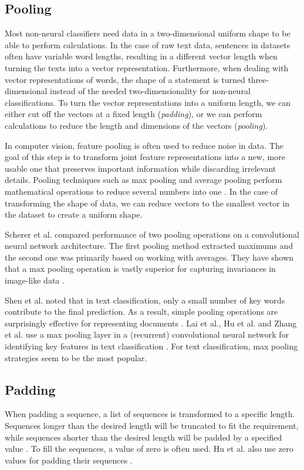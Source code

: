 \subsection{Pooling}
Most non-neural classifiers need data in a two-dimensional uniform shape to be able to perform calculations. 
In the case of raw text data, sentences in datasets often have variable word lengths, resulting in a different vector length when turning the texts into a vector representation.
Furthermore, when dealing with vector representations of words, the shape of a statement is turned three-dimensional instead of the needed two-dimensionality for non-neural classifications.
To turn the vector representations into a uniform length, we can either cut off the vectors at a fixed length (\textit{padding}), or we can perform calculations to reduce the length and dimensions of the vectors (\textit{pooling}).

In computer vision, feature pooling is often used to reduce noise in data. 
The goal of this step is to transform joint feature representations into a new, more usable one that preserves important information while discarding irrelevant details.
Pooling techniques such as max pooling and average pooling perform mathematical operations to reduce several numbers into one \cite{boureau2010}. 
In the case of transforming the shape of data, we can reduce vectors to the smallest vector in the dataset to create a uniform shape.

Scherer et al. compared performance of two pooling operations on a convolutional neural network architecture. 
The first pooling method extracted maximums and the second one was primarily based on working with averages.
They have shown that a max pooling operation is vastly superior for capturing invariances in image-like data \cite{scherer2010}.

Shen et al. noted that in text classification, only a small number of key words contribute to the final prediction.
As a result, simple pooling operations are surprisingly effective for representing documents \cite{shen2018}.  
Lai et al., Hu et al. and Zhang et al. use a max pooling layer in a (recurrent) convolutional neural network for identifying key features in text classification \cite{lai2015,hu2014,zhang2015}. 
For text classification, max pooling strategies seem to be the most popular. 

\subsection{Padding}
When padding a sequence, a list of sequences is transformed to a specific length. 
Sequences longer than the desired length will be truncated to fit the requirement, while sequences shorter than the desired length will be padded by a specified value \cite{keraspad}. 
To fill the sequences, a value of zero is often used. Hu et al. also use zero values for padding their sequences \cite{hu2014}. 

